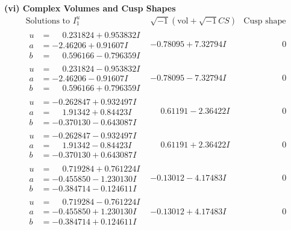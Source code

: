 \documentclass[1p]{elsarticle_modified}
\theoremstyle{definition}
\newcommand{\I}{\sqrt{-1}}
\begin{document}
\newpage\flushleft \textbf{(vi) Complex Volumes and Cusp Shapes}
$$\begin{array}{c|c|c}  
\text{Solutions to }I^u_{1}& \I (\text{vol} + \sqrt{-1}CS) & \text{Cusp shape}\\
 \hline 
\begin{aligned}
u &= \phantom{-}0.231824 + 0.953832 I \\
a &= -2.46206 + 0.91607 I \\
b &= \phantom{-}0.596166 - 0.796359 I\end{aligned}
 & -0.78095 + 7.32794 I & \phantom{-0.000000 } 0 \\ \hline\begin{aligned}
u &= \phantom{-}0.231824 - 0.953832 I \\
a &= -2.46206 - 0.91607 I \\
b &= \phantom{-}0.596166 + 0.796359 I\end{aligned}
 & -0.78095 - 7.32794 I & \phantom{-0.000000 } 0 \\ \hline\begin{aligned}
u &= -0.262847 + 0.932497 I \\
a &= \phantom{-}1.91342 + 0.84423 I \\
b &= -0.370130 - 0.643087 I\end{aligned}
 & \phantom{-}0.61191 - 2.36422 I & \phantom{-0.000000 } 0 \\ \hline\begin{aligned}
u &= -0.262847 - 0.932497 I \\
a &= \phantom{-}1.91342 - 0.84423 I \\
b &= -0.370130 + 0.643087 I\end{aligned}
 & \phantom{-}0.61191 + 2.36422 I & \phantom{-0.000000 } 0 \\ \hline\begin{aligned}
u &= \phantom{-}0.719284 + 0.761224 I \\
a &= -0.455850 - 1.230130 I \\
b &= -0.384714 - 0.124611 I\end{aligned}
 & -0.13012 - 4.17483 I & \phantom{-0.000000 } 0 \\ \hline\begin{aligned}
u &= \phantom{-}0.719284 - 0.761224 I \\
a &= -0.455850 + 1.230130 I \\
b &= -0.384714 + 0.124611 I\end{aligned}
 & -0.13012 + 4.17483 I & \phantom{-0.000000 } 0 \\ \hline\begin{aligned}

\end{aligned}
\end{array}$$
\end{document}
